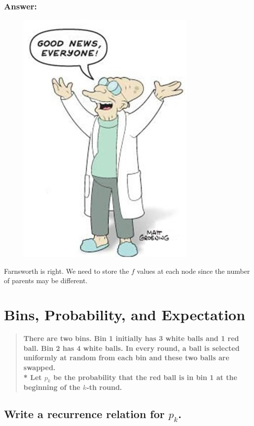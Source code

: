\documentclass[titlepage]{article}
\theoremstyle{definition}
\begin{document}
    \subsubsection{Answer: }
      \begin{figure}
        \centering
          \includegraphics[scale=0.3]{farnsworth}
      \end{figure}
      Farnsworth is right. We need to store the $f$ values at each node since
      the number of parents may be different. 


\section{Bins, Probability, and Expectation}
\begin{quote}
  \textbf{There are two bins. Bin 1 initially has 3 white balls and 1 red ball.
  Bin 2 has 4 white balls. In every round, a ball is selected uniformly at
  random from each bin and these two balls are swapped. \\*
  Let $p_k$ be the probability that the red ball is in bin 1 at the beginning of
  the $k$-th round.}
\end{quote}

\subsection{ Write a recurrence relation for $p_k$. }
\end{document}

